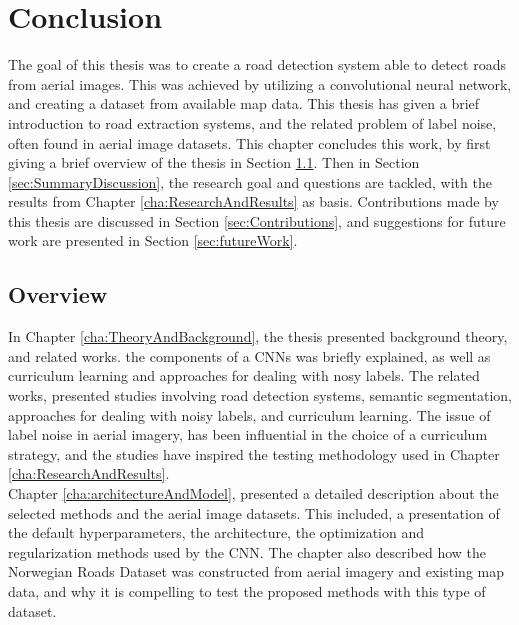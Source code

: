 \documentclass[a4paper]{book}
\begin{document}
\chapter{Conclusion}
\label{cha:evaluationAndConclusion}
The goal of this thesis was to create a road detection system able to detect roads from aerial images. This was achieved by utilizing a convolutional neural network, and creating a dataset from available map data. This thesis has given a brief introduction to road extraction systems, and the related problem of label noise, often found in aerial image datasets. This chapter concludes this work, by first giving a brief overview of the thesis in Section \ref{sec:summaryOverview}. Then in Section \ref{sec:SummaryDiscussion}, the research goal and questions are tackled, with the results from Chapter \ref{cha:ResearchAndResults} as basis. Contributions made by this thesis are discussed in Section \ref{sec:Contributions}, and suggestions for future work are presented in Section \ref{sec:futureWork}.\\

\section{Overview}
\label{sec:summaryOverview}
In Chapter \ref{cha:TheoryAndBackground}, the thesis presented background theory, and related works. the components of a \ac{CNN}s was briefly explained, as well as curriculum learning and approaches for dealing with nosy labels. The related works, presented studies involving road detection systems, semantic segmentation, approaches for dealing with noisy labels, and curriculum learning. The issue of label noise in aerial imagery, has been influential in the choice of a curriculum strategy, and the studies have inspired the testing methodology used in Chapter \ref{cha:ResearchAndResults}.\\

Chapter \ref{cha:architectureAndModel}, presented a detailed description about the selected methods and the aerial image datasets. This included, a presentation of the default hyperparameters, the architecture, the optimization and regularization methods used by the \ac{CNN}. The chapter also described how the Norwegian Roads Dataset was constructed from aerial imagery and existing map data, and why it is compelling to test the proposed methods with this type of dataset.\\
\end{document}
